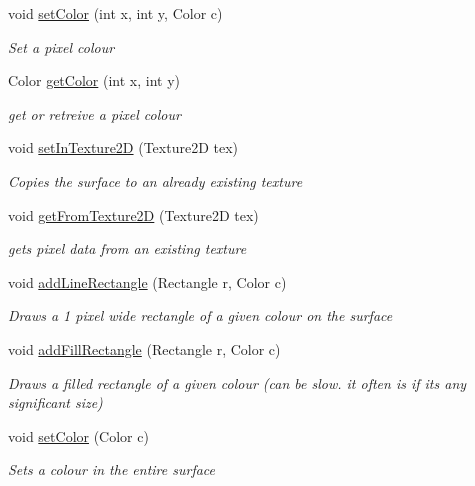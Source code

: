 \begin{DoxyCompactItemize}
void \mbox{\hyperlink{class_r_c___framework_1_1_r_c___surface_a163695b3e6c5df4a9cbacc5d3f33ab44}{set\+Color}} (int x, int y, Color c)
\begin{DoxyCompactList}\small\item\em Set a pixel colour \end{DoxyCompactList}\item 
Color \mbox{\hyperlink{class_r_c___framework_1_1_r_c___surface_acafd7281d388d077a1b1afaea6743718}{get\+Color}} (int x, int y)
\begin{DoxyCompactList}\small\item\em get or retreive a pixel colour \end{DoxyCompactList}\item 
void \mbox{\hyperlink{class_r_c___framework_1_1_r_c___surface_a131d4ac4006056b9e6a62ae82aaae603}{set\+In\+Texture2D}} (Texture2D tex)
\begin{DoxyCompactList}\small\item\em Copies the surface to an already existing texture \end{DoxyCompactList}\item 
void \mbox{\hyperlink{class_r_c___framework_1_1_r_c___surface_a93d79ef4363e12e80a454dc49a80770a}{get\+From\+Texture2D}} (Texture2D tex)
\begin{DoxyCompactList}\small\item\em gets pixel data from an existing texture \end{DoxyCompactList}\item 
void \mbox{\hyperlink{class_r_c___framework_1_1_r_c___surface_abab645c5b58a88c3b1e13d1624163272}{add\+Line\+Rectangle}} (Rectangle r, Color c)
\begin{DoxyCompactList}\small\item\em Draws a 1 pixel wide rectangle of a given colour on the surface \end{DoxyCompactList}\item 
void \mbox{\hyperlink{class_r_c___framework_1_1_r_c___surface_a93af5231a5d6cb46ce86fc9895a3cd29}{add\+Fill\+Rectangle}} (Rectangle r, Color c)
\begin{DoxyCompactList}\small\item\em Draws a filled rectangle of a given colour (can be slow. it often is if its any significant size) \end{DoxyCompactList}\item 
void \mbox{\hyperlink{class_r_c___framework_1_1_r_c___surface_adc92e7c233e99edec13e4831b413a531}{set\+Color}} (Color c)
\begin{DoxyCompactList}\small\item\em Sets a colour in the entire surface \end{DoxyCompactList}\item 

\end{DoxyCompactItemize}
